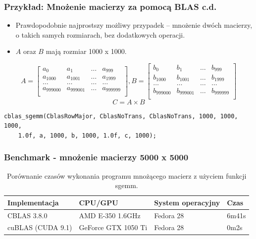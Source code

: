 \documentclass[dvipsnames,table]{beamer}
\begin{document}
\begin{frame}[fragile]
	\frametitle{Przykład: Mnożenie macierzy za pomocą BLAS c.d.}
\begin{itemize}
	\item Prawdopodobnie najprostszy możliwy przypadek -- mnożenie dwóch macierzy, o takich samych rozmiarach, bez dodatkowych operacji. 
	\item $A$ oraz $B$ mają rozmiar 1000 x 1000.
\end{itemize}
\scriptsize
\[
A =
\begin{bmatrix}
	a_{0} & a_{1} & \dots & a_{999} \\
	a_{1000} & a_{1001} & \dots & a_{1999} \\
	\dots & \dots & \dots & \dots \\
	a_{999000} & a_{999001} & \dots & a_{999999} \\
\end{bmatrix}
, B = 
\begin{bmatrix}
	b_{0} & b_{1} & \dots & b_{999} \\
	b_{1000} & b_{1001} & \dots & b_{1999} \\
	\dots & \dots & \dots & \dots \\
	b_{999000} & b_{999001} & \dots & b_{999999} \\
\end{bmatrix}
\]
\[
C = A \times B
\]
\normalsize
\begin{lstlisting}
cblas_sgemm(CblasRowMajor, CblasNoTrans, CblasNoTrans, 1000, 1000, 1000,
	1.0f, a, 1000, b, 1000, 1.0f, c, 1000);
\end{lstlisting}
\end{frame}

\begin{frame}
\frametitle{Benchmark - mnożenie macierzy 5000 x 5000}
\begin{table}[]
\centering
\caption{Porównanie czasów wykonania programu mnożącego macierz z użyciem funkcji sgemm.}
\label{porownanie}
\scriptsize
\begin{tabular}{llll}
\hline
Implementacja & CPU/GPU   & System operacyjny & Czas  \\ \hline
CBLAS 3.8.0   & AMD E-350 1.6GHz & Fedora 28         & 6m41s \\
cuBLAS (CUDA 9.1) & GeForce GTX 1050 Ti & Fedora 28 & 0m2s  \\ \hline
\end{tabular}
\normalsize
\end{table}
\end{frame}
\end{document}
